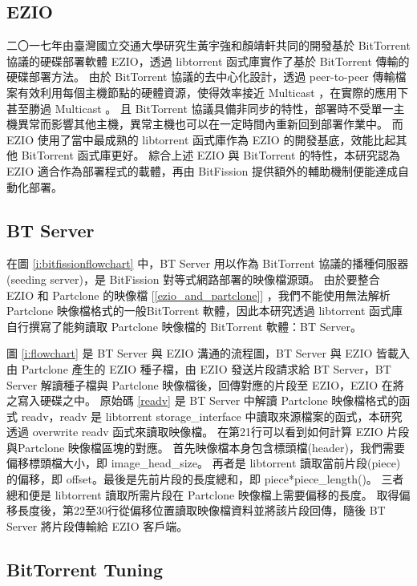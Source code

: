 \subsection{EZIO}
二〇一七年由臺灣國立交通大學研究生黃宇強和顏靖軒共同的開發基於 BitTorrent 協議的硬碟部署軟體 EZIO\cite{ezio}，透過 libtorrent 函式庫實作了基於 BitTorrent 傳輸的硬碟部署方法。
由於 BitTorrent 協議的去中心化設計，透過 peer-to-peer 傳輸檔案有效利用每個主機節點的硬體資源，使得效率接近 Multicast ，在實際的應用下甚至勝過 Multicast 。
且 BitTorrent 協議具備非同步的特性，部署時不受單一主機異常而影響其他主機，異常主機也可以在一定時間內重新回到部署作業中。
而 EZIO 使用了當中最成熟的 libtorrent 函式庫作為 EZIO 的開發基底，效能比起其他 BitTorrent 函式庫更好。
綜合上述 EZIO 與 BitTorrent 的特性，本研究認為 EZIO 適合作為部署程式的載體，再由 BitFission 提供額外的輔助機制便能達成自動化部署。

\subsection{BT Server}

在圖 \ref{i:bitfissionflowchart} 中，BT Server 用以作為 BitTorrent 協議的播種伺服器(seeding server)，是 BitFission 對等式網路部署的映像檔源頭。
由於要整合 EZIO 和 Partclone 的映像檔 [\ref{ezio_and_partclone}] ，我們不能使用無法解析 Partclone 映像檔格式的一般BitTorrent 軟體，因此本研究透過 libtorrent 函式庫自行撰寫了能夠讀取 Partclone 映像檔的 BitTorrent 軟體：BT Server。

圖 \ref{i:flowchart} 是 BT Server 與 EZIO 溝通的流程圖，BT Server 與 EZIO 皆載入由 Partclone 產生的 EZIO 種子檔，由 EZIO 發送片段請求給 BT Server，BT Server 解讀種子檔與 Partclone 映像檔後，回傳對應的片段至 EZIO，EZIO 在將之寫入硬碟之中。
原始碼 \ref{readv} 是 BT Server 中解讀 Partclone 映像檔格式的函式 readv，readv 是 libtorrent storage\_interface 中讀取來源檔案的函式，本研究透過 overwrite readv 函式來讀取映像檔。
在第21行可以看到如何計算 EZIO 片段與Partclone 映像檔區塊的對應。
首先映像檔本身包含標頭檔(header)，我們需要偏移標頭檔大小，即 image\_head\_size。
再者是 libtorrent 讀取當前片段(piece)的偏移，即 offset。最後是先前片段的長度總和，即 piece*piece\_length()。
三者總和便是 libtorrent 讀取所需片段在 Partclone 映像檔上需要偏移的長度。
取得偏移長度後，第22至30行從偏移位置讀取映像檔資料並將該片段回傳，隨後 BT Server 將片段傳輸給 EZIO 客戶端。


\subsection{BitTorrent Tuning}

